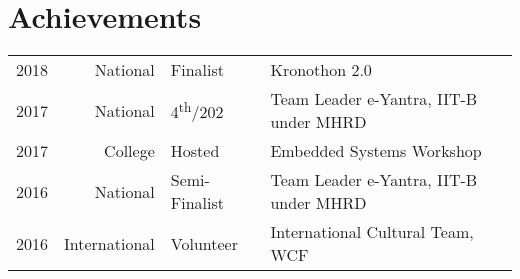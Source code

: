 \documentclass[]{deedy-resume-openfont}
\begin{document}
\begin{minipage}[t]{0.66\textwidth}
\section{Achievements} 
\begin{tabular}{rrll}
2018 & National & Finalist & Kronothon 2.0 \\
2017 & National & 4\textsuperscript{th}/202  & Team Leader e-Yantra, IIT-B under MHRD \\
2017 & College & Hosted & Embedded Systems Workshop \\
2016 & National & Semi-Finalist & Team Leader e-Yantra, IIT-B under MHRD \\
2016 & International & Volunteer & International Cultural Team, WCF \\
\end{tabular}
\sectionsep

\end{minipage} 
\end{document}
